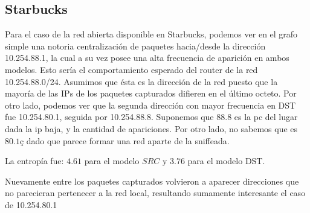 \subsection{Starbucks}


Para el caso de la red abierta disponible en Starbucks, podemos ver en el 
grafo simple una notoria centralizaci\'on de paquetes hacia/desde la direcci\'on
10.254.88.1, la cual a su vez posee una alta frecuencia de aparici\'on en ambos
modelos. Esto ser\'ia el comportamiento esperado del router de la red
10.254.88.0/24. Asumimos que \'esta es la direcci\'on de la red puesto que 
la mayor\'ia de las IPs de los paquetes capturados difieren en el \'ultimo octeto.
Por otro lado, podemos ver que la segunda direcci\'on con mayor frecuencia en DST
fue 10.254.80.1, seguida por 10.254.88.8. Suponemos que $88.8$ es la pc del lugar
dada la ip baja, y la cantidad de apariciones. Por otro lado, no sabemos que es
$80.1ç$ dado que parece formar una red aparte de la sniffeada.

La entrop\'ia fue: $4.61$ para el modelo $SRC$ y $3.76$ para el modelo
DST.


Nuevamente entre los paquetes capturados volvieron a aparecer direcciones que
no parecieran pertenecer a la red local, resultando sumamente interesante el caso
de 10.254.80.1


